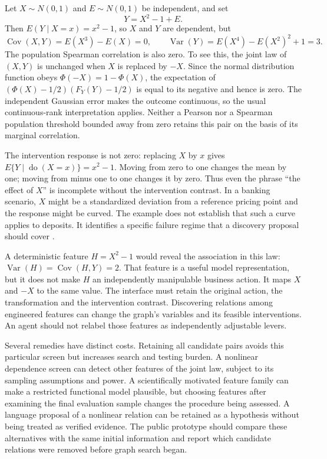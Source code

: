 Let $X\sim N(0,1)$ and $E\sim N(0,1)$ be independent, and set
\[
 Y=X^2-1+E.
\]
Then $E(Y\mid X=x)=x^2-1$, so $X$ and $Y$ are dependent, but
\[
 \operatorname{Cov}(X,Y)=E(X^3)-E(X)=0,
 \qquad \operatorname{Var}(Y)=E(X^4)-E(X^2)^2+1=3.
\]
The population Spearman correlation is also zero. To see this, the joint law
of $(X,Y)$ is unchanged when $X$ is replaced by $-X$. Since the normal
distribution function obeys $\Phi(-X)=1-\Phi(X)$, the expectation of
$(\Phi(X)-1/2)(F_Y(Y)-1/2)$ is equal to its negative and hence is zero.
The independent Gaussian error makes the outcome continuous, so the usual
continuous-rank interpretation applies. Neither a Pearson nor a Spearman
population threshold bounded away from zero retains this pair on the basis
of its marginal correlation.

The intervention response is not zero: replacing $X$ by $x$ gives
$E\{Y\mid\operatorname{do}(X=x)\}=x^2-1$. Moving from zero to one changes
the mean by one; moving from minus one to one changes it by zero. Thus even
the phrase ``the effect of $X$'' is incomplete without the intervention
contrast. In a banking scenario, $X$ might be a standardized deviation from
a reference pricing point and the response might be curved. The example
does not establish that such a curve applies to deposits. It identifies a
specific failure regime that a discovery proposal should cover
\citep{exec14_discovery_screening_value}.

A deterministic feature $H=X^2-1$ would reveal the association in this law:
$\operatorname{Var}(H)=\operatorname{Cov}(H,Y)=2$. That feature is a useful
model representation, but it does not make $H$ an independently manipulable
business action. It maps $X$ and $-X$ to the same value. The interface must
retain the original action, the transformation and the intervention contrast.
Discovering relations among engineered features can change the graph's
variables and its feasible interventions. An agent should not relabel those
features as independently adjustable levers.

Several remedies have distinct costs. Retaining all candidate pairs avoids
this particular screen but increases search and testing burden. A nonlinear
dependence screen can detect other features of the joint law, subject to its
sampling assumptions and power. A scientifically motivated feature family
can make a restricted functional model plausible, but choosing features after
examining the final evaluation sample changes the procedure being assessed.
A language proposal of a nonlinear relation can be retained as a hypothesis
without being treated as verified evidence. The public prototype should
compare these alternatives with the same initial information and report
which candidate relations were removed before graph search began.

